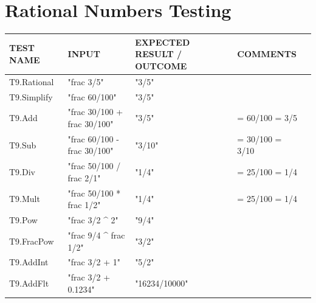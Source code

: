 \documentclass[a4paper, oneside, 11pt]{report}
\begin{document}
    \section{Rational Numbers Testing}
    \label{RatNumTest}
    \begin{tabular}{|p{1.5in}|p{1.5in}|p{1.6in}|p{1.6in}|p{2.4in}|}
        \hline
        TEST NAME       & INPUT                     & EXPECTED RESULT / OUTCOME              & COMMENTS                                \\
        \hline
        T9.Rational    & "frac 3/5"                                     & "3/5"                                    &                                        \\
        \hline
        T9.Simplify    & "frac 60/100"                                  & "3/5"                                    &                                        \\
        \hline
        T9.Add         & "frac 30/100 + frac 30/100"                    & "3/5"                                    & = 60/100 = 3/5                         \\
        \hline
        T9.Sub         & "frac 60/100 - frac 30/100"                    & "3/10"                                   & = 30/100 = 3/10                        \\
        \hline
        T9.Div         & "frac 50/100 / frac 2/1"                       & "1/4"                                    & = 25/100 = 1/4                         \\
        \hline
        T9.Mult        & "frac 50/100 * frac 1/2"                       & "1/4"                                    & = 25/100 = 1/4                         \\
        \hline
        T9.Pow         & "frac 3/2 \^{} 2"                              & "9/4"                                    &                                        \\
        \hline
        T9.FracPow     & "frac 9/4 \^{} frac 1/2"                            & "3/2"                                    &                                        \\
        \hline
        T9.AddInt      & "frac 3/2 + 1"                                 & "5/2"                                    &                                        \\
        \hline
        T9.AddFlt      & "frac 3/2 + 0.1234"                       & "16234/10000"                  &                                        \\

\end{tabular}
\end{document}
